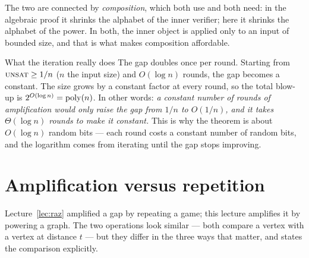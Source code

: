 \noindent
The two are connected by \emph{composition}, which both use and both need: in the algebraic proof it shrinks the alphabet of the inner verifier; here it shrinks the alphabet of the power.  In both, the inner object is applied only to an input of bounded size, and that is what makes composition affordable.

\begin{bigpicture}{What the iteration really does}
The gap doubles once per round.  Starting from $\textsc{unsat}\ge1/n$ ($n$ the input size) and $O(\log n)$ rounds, the gap becomes a constant.  The size grows by a constant factor at every round, so the total blow-up is $2^{O(\log n)}=\operatorname{poly}(n)$.
In other words: \emph{a constant number of rounds of amplification would only raise the gap from $1/n$ to $O(1/n)$, and it takes $\Theta(\log n)$ rounds to make it constant.}
This is why the theorem is about $O(\log n)$ random bits --- each round costs a constant number of random bits, and the logarithm comes from iterating until the gap stops improving.
\end{bigpicture}


\section{Amplification versus repetition}
\label{sec:amp-vs-rep}

Lecture~\ref{lec:raz} amplified a gap by repeating a game; this lecture amplifies it by powering a graph.  The two operations look similar --- both compare a vertex with a vertex at distance $t$ --- but they differ in the three ways that matter, and \citet[Section~9]{Dinur07} states the comparison explicitly.

